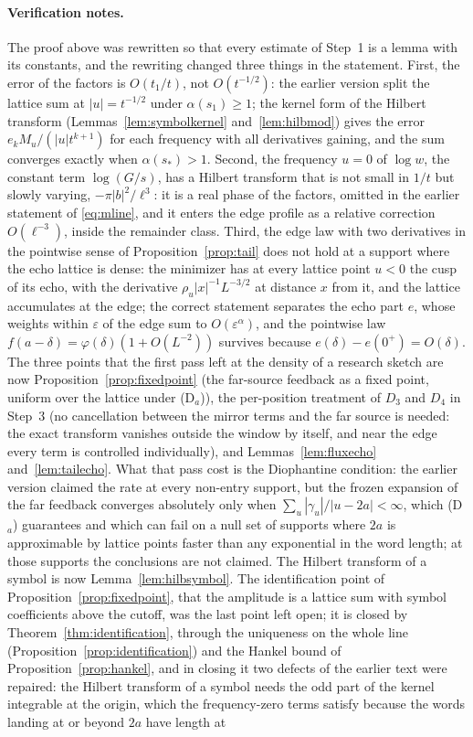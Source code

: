 \documentclass[11pt]{article}
\theoremstyle{definition}
\theoremstyle{remark}
\begin{document}
\paragraph*{Verification notes.} The proof above was rewritten so that every estimate of Step~1 is a lemma with its constants, and the rewriting changed three things in the statement. First, the error of the factors is $O(t_1/t)$, not $O(t^{-1/2})$: the earlier version split the lattice sum at $|u|=t^{-1/2}$ under $\alpha(s_1)\ge1$; the kernel form of the Hilbert transform (Lemmas~\ref{lem:symbolkernel} and~\ref{lem:hilbmod}) gives the error $e_k M_u/(|u|t^{k+1})$ for each frequency with all derivatives gaining, and the sum converges exactly when $\alpha(s_*)>1$. Second, the frequency $u=0$ of $\log w$, the constant term $\log(G/s)$, has a Hilbert transform that is not small in $1/t$ but slowly varying, $-\pi|b|^2/\ell^3$: it is a real phase of the factors, omitted in the earlier statement of \eqref{eq:mline}, and it enters the edge profile as a relative correction $O(\ell^{-3})$, inside the remainder class. Third, the edge law with two derivatives in the pointwise sense of Proposition~\ref{prop:tail} does not hold at a support where the echo lattice is dense: the minimizer has at every lattice point $u<0$ the cusp of its echo, with the derivative $\rho_u|x|^{-1}L^{-3/2}$ at distance $x$ from it, and the lattice accumulates at the edge; the correct statement separates the echo part $e$, whose weights within $\varepsilon$ of the edge sum to $O(\varepsilon^{\alpha})$, and the pointwise law $f(a-\delta)=\varphi(\delta)(1+O(L^{-2}))$ survives because $e(\delta)-e(0^+)=O(\delta)$. The three points that the first pass left at the density of a research sketch are now Proposition~\ref{prop:fixedpoint} (the far-source feedback as a fixed point, uniform over the lattice under (D$_a$)), the per-position treatment of $D_3$ and $D_4$ in Step~3 (no cancellation between the mirror terms and the far source is needed: the exact transform vanishes outside the window by itself, and near the edge every term is controlled individually), and Lemmas~\ref{lem:fluxecho} and~\ref{lem:tailecho}. What that pass cost is the Diophantine condition: the earlier version claimed the rate at every non-entry support, but the frozen expansion of the far feedback converges absolutely only when $\sum_u|\gamma_u|/|u-2a|<\infty$, which (D$_a$) guarantees and which can fail on a null set of supports where $2a$ is approximable by lattice points faster than any exponential in the word length; at those supports the conclusions are not claimed. The Hilbert transform of a symbol is now Lemma~\ref{lem:hilbsymbol}. The identification point of Proposition~\ref{prop:fixedpoint}, that the amplitude is a lattice sum with symbol coefficients above the cutoff, was the last point left open; it is closed by Theorem~\ref{thm:identification}, through the uniqueness on the whole line (Proposition~\ref{prop:identification}) and the Hankel bound of Proposition~\ref{prop:hankel}, and in closing it two defects of the earlier text were repaired: the Hilbert transform of a symbol needs the odd part of the kernel integrable at the origin, which the frequency-zero terms satisfy because the words landing at or beyond $2a$ have length at 
\end{document}
